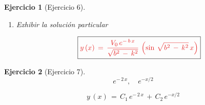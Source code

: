 \documentclass[a4paper,11pt, openany]{book}
\newtheorem{ejer}{Ejercicio}[section]
\newcommand*{\itembolasazules}[1]{%
\footnotesize\protect\tikz[baseline=-3pt]%
\protect\node[scale=.7, circle, shade, ball
color=green]{\color{white}\Large\bf#1};}
\begin{document}
\begin{ejer}[Ejercicio 6]
\begin{enumerate}[label=\itembolasazules{\arabic*}]
$$y\,(\textcolor{lust}{0})\,=\,e^{-\,b\,(\textcolor{lust}{0})}\,\left(C_{1}\,\cos\,\sqrt{b^{2}\,-\,k^{2}}\,(\textcolor{lust}{0})\,+\,C_{2}\,\sin\,\sqrt{b^{2}\,-\,k^{2}}\,(\textcolor{lust}{0}) \right)$$
 
$$C_{1}\,\cos\,0\,+\,C_{2}\,\sin\,0\,=\,0 \quad \textcolor{lust}{\iff} \quad \boxed{C_{1}\,=\,0}$$
 
\begin{multline*}
y'\,(\textcolor{lust}{0})\,=\,-\,b\,e^{-\,b\,(\textcolor{lust}{0})}\,\left(\cancel{C_{1}\,\cos\,\sqrt{b^{2}\,-\,k^{2}}\,(\textcolor{lust}{0})}\,+\,C_{2}\,\sin\,\sqrt{b^{2}\,-\,k^{2}}\,(\textcolor{lust}{0}) \right)\,\textcolor{lust}{+} \\
e^{-\,b\,(\textcolor{lust}{0})}\,\left[\cancel{C_{1}\,\left(-\,\sin\,\sqrt{b^{2}\,-\,k^{2}}\,x \right)\,\textcolor{lust}{\times}\,\sqrt{b^{2}\,-\,k^{2}}}\,+\,C_{2}\,\left(\cos\,\sqrt{b^{2}\,-\,k^{2}}\,(\textcolor{lust}{0}) \right)\,\textcolor{lust}{\times}\,\sqrt{b^{2}\,-\,k^{2}}  \right]    
\end{multline*}
 
$$-\,b\,\left(\sin\,0 \right)\,+\,C_{2}\,\sqrt{b^{2}\,-\,k^{2}}\,\cos\,0\,=\,V_{0} \quad \textcolor{lust}{\iff} \quad C_{2}\,\sqrt{b^{2}\,-\,k^{2}}\,=\,V_{0}$$
 
$$\boxed{C_{2}\,=\,\dfrac{V_{0}}{\sqrt{b^{2}\,-\,k^{2} }}}$$
 
\item Exhibir la solución particular
 
$$\boxed{\textcolor{lust}{y\,(x)\,=\,\dfrac{V_{0}\,e^{-\,b\,x}}{\sqrt{b^{2}\,-\,k^{2} }}\,\left(\sin\,\sqrt{b^{2}\,-\,k^{2}}\,x \right)}}$$
 
\end{enumerate}

\end{ejer}
 
\begin{ejer}[Ejercicio 7]

$$e^{-\,2\,x}, \quad e^{-x/2}$$

$$\boxed{y\,(x)\,=\,C_{1}\,e^{-\,2\,x}\,+\,C_{2}\,e^{-x/2}}$$
 
\end{ejer}
 
\end{document}
